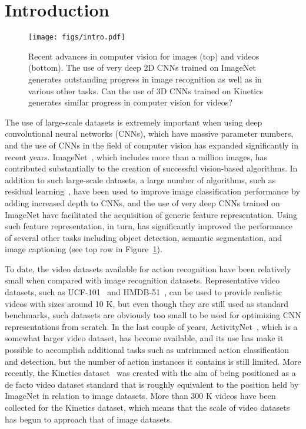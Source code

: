 \documentclass[10pt,twocolumn,letterpaper]{article}
\begin{document}
\section{Introduction}
  \begin{figure}[t]
    \centering
    \texttt{[image: figs/intro.pdf]}
    \caption{
      Recent advances in computer vision for images (top) and videos (bottom).
      The use of very deep 2D CNNs trained on ImageNet 
      generates outstanding progress in image recognition as well as in various other tasks.
      Can the use of 3D CNNs trained on Kinetics generates similar progress in computer vision for videos?
    }\label{fig:intro}
  \end{figure}
  The use of large-scale datasets is extremely important when using deep convolutional neural networks (CNNs),
  which have massive parameter numbers,
  and the use of CNNs in the field of computer vision has expanded significantly in recent years.
  ImageNet~\cite{imagenet_cvpr09}, which includes more than a million images,
  has contributed substantially to the creation of successful vision-based algorithms.
  In addition to such large-scale datasets, a large number of algorithms, such as residual learning~\cite{ResNet},
  have been used to improve image classification performance by adding increased depth to CNNs,
  and the use of very deep CNNs trained on ImageNet have facilitated the acquisition of generic feature representation.
  Using such feature representation, in turn, has significantly improved the performance of several other tasks 
  including object detection, semantic segmentation, and image captioning (see top row in Figure~\ref{fig:intro}).

  To date, the video datasets available for action recognition have been relatively small when compared with image recognition datasets. 
  Representative video datasets, such as UCF-101~\cite{UCF101} and HMDB-51~\cite{HMDB51},
  can be used to provide realistic videos with sizes around 10 K, 
  but even though they are still used as standard benchmarks, 
  such datasets are obviously too small to be used for optimizing CNN representations from scratch.
  In the last couple of years, ActivityNet~\cite{activitynet}, which is a somewhat larger video dataset, has become available,
  and its use has make it possible to accomplish additional tasks such as untrimmed action classification and detection,
  but the number of action instances it contains is still limited.
  More recently, the Kinetics dataset~\cite{Kinetics} was created with the aim of being positioned as
  a de facto video dataset standard that is roughly equivalent to the position held by ImageNet in relation to image datasets.
  More than 300 K videos have been collected for the Kinetics dataset, 
  which means that the scale of video datasets has begun to approach that of image datasets.
\end{document}
